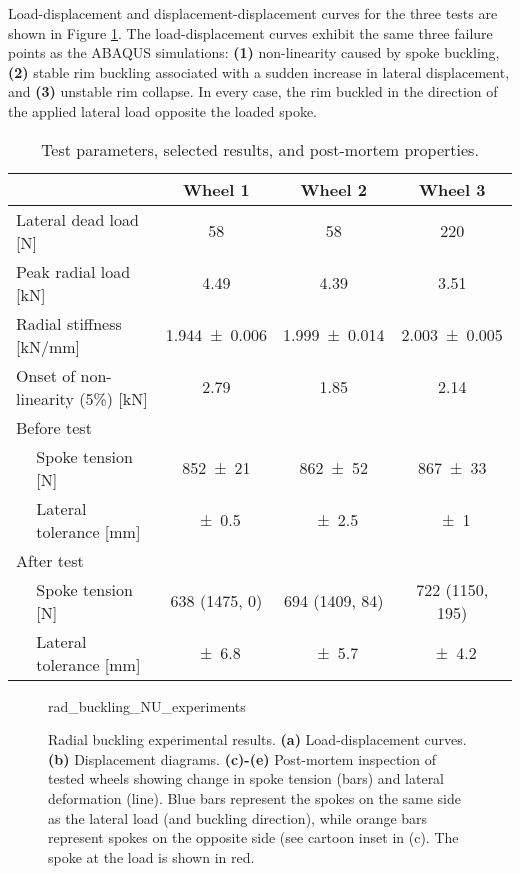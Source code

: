 \documentclass[\rootdir/thesis.tex]{subfiles}
\begin{document}
Load-displacement and displacement-displacement curves for the three tests are shown in Figure \ref{fig:rad_buckling_NU_experiments}. The load-displacement curves exhibit the same three failure points as the ABAQUS simulations: \textbf{(1)} non-linearity caused by spoke buckling, \textbf{(2)} stable rim buckling associated with a sudden increase in lateral displacement, and \textbf{(3)} unstable rim collapse. In every case, the rim buckled in the direction of the applied lateral load opposite the loaded spoke.

\begin{table}
\caption{Test parameters, selected results, and post-mortem properties.}
\label{tab:rad_buckling_tests}
\begin{tabular}{llccc}
\hline
&& \bf Wheel 1 & \bf Wheel 2 & \bf Wheel 3\\
\hline
\multicolumn{2}{l}{Lateral dead load [\si{N}]} & \num{58} & \num{58} & \num{220}\\
\multicolumn{2}{l}{Peak radial load [\si{kN}]} & \num{4.49} & \num{4.39} & \num{3.51}\\
\multicolumn{2}{l}{Radial stiffness [\si{kN/mm}]} & \num{1.944+-0.006} & \num{1.999+-0.014} & \num{2.003+-0.005}\\
\multicolumn{2}{l}{Onset of non-linearity (5\%) [\si{kN}]} & \num{2.79} & \num{1.85} & \num{2.14}\\
\multicolumn{5}{l}{Before test}\\
\,& Spoke tension [\si{N}]      & \num{852+-21} & \num{862+-52} & \num{867+-33}\\
\,& Lateral tolerance [\si{mm}] & \num{+-0.5} & \num{+-2.5} & \num{+-1}\\

\multicolumn{5}{l}{After test}\\
\,& Spoke tension [\si{N}]      & 638 (1475, 0) & 694 (1409, 84) & 722 (1150, 195)\\
\,& Lateral tolerance [\si{mm}] & \num{+-6.8} & \num{+-5.7} & \num{+-4.2}\\
\hline
\end{tabular}
\end{table}

\begin{figure}[h]
\centering
{rad_buckling_NU_experiments}
\caption{Radial buckling experimental results. \textbf{(a)} Load-displacement curves. \textbf{(b)} Displacement diagrams. \textbf{(c)-(e)} Post-mortem inspection of tested wheels showing change in spoke tension (bars) and lateral deformation (line). Blue bars represent the spokes on the same side as the lateral load (and buckling direction), while orange bars represent spokes on the opposite side (see cartoon inset in (c). The spoke at the load is shown in red.}
\label{fig:rad_buckling_NU_experiments}
\end{figure}
\end{document}
